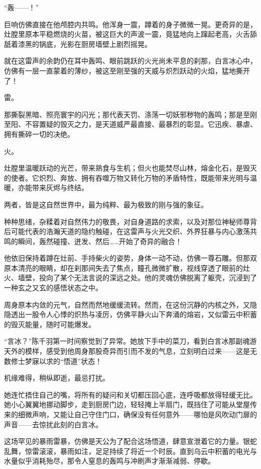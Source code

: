 “轰——！”

巨响仿佛直接在他颅腔内共鸣。他浑身一震，蹲着的身子微微一晃。更奇异的是，灶膛里原本平稳燃烧的火苗，被这巨大的声波一震，竟猛地向上蹿起老高，火舌舔舐着漆黑的锅底，光影在厨房墙壁上剧烈摇晃。

就在这雷声的余韵仍在耳中轰鸣、眼前跳跃的火光尚未平息的刹那，白言冰心中，仿佛有一层一直蒙着的薄纱，被这至刚至强的天威与炽烈跃动的火焰，猛地撕开了！

雷。

那撕裂黑暗、照亮寰宇的闪光；那代表天罚、涤荡一切妖邪秽物的轰鸣；那是至刚至阳、不容置疑的毁灭之力，是天道威严最直接、最暴烈的彰显。它迅疾、暴虐、拥有撕碎一切的决绝。

火。

灶膛里温暖跃动的光芒，带来熟食与生机；但火也能焚尽山林，熔金化石，是毁灭的使者。它炽烈、奔放、拥有吞噬万物又转化万物的矛盾特性，既能带来光明与温暖，亦能带来灰烬与终结。

两者，皆是这自然世界中，最为纯粹、最为极致的刚与强的象征。

种种思绪，杂糅着对自然伟力的敬畏，对自身道路的求索，以及对那位神秘师尊背后可能代表的浩瀚天道的隐约触碰，在这雷声与火光交织、外界狂暴与内心激荡共鸣的瞬间，轰然碰撞、迸发、然后……开始了奇异的融合！

他依旧保持着蹲在灶前、手持柴火的姿势，身体一动不动，仿佛一尊石雕。但那双原本清亮的眼睛，却在刹那间失去了焦点，瞳孔微微扩散，视线穿透了眼前的灶火、墙壁，投向了某个无法言说的深远之处。他的灵魂仿佛脱离了躯壳，沉浸到了一种玄之又玄的感悟状态之中。

周身原本内敛的元气，自然而然地缓缓流转。然而，在这份沉静的内核之外，又隐隐透出一股令人心悸的炽热与凌厉，仿佛平静火山下奔涌的熔岩，又似雷云中积蓄的毁灭能量，随时可能爆发。

“言冰？”陈千羽第一时间察觉到了异常。她放下手中的菜刀，看到白言冰那副魂游天外的模样，感受到他周身那股奇异而引而不发的气息，立刻明白过来——这是无数修士梦寐以求的“悟道”状态！

机缘难得，稍纵即逝，最忌打扰。

她连忙捂住自己的嘴，将所有的疑问和关切都压回心底，连呼吸都放得轻缓无比。她小心翼翼地挪动脚步，走到厨房门边，轻轻掩上半扇门，既挡住了可能从堂屋传来的细微声响，又能让自己守住门口，确保没有任何意外——哪怕是风吹动门扉的声音——去惊扰此刻的白言冰。

这场罕见的暴雨雷暴，仿佛是天公为了配合这场悟道，肆意宣泄着它的力量。银蛇乱舞，惊雷滚滚，暴雨如注，足足持续了将近一个时辰。直到乌云中积蓄的电光与水量似乎消耗殆尽，那令人窒息的轰鸣与冲刷声才渐渐减弱、停歇。

